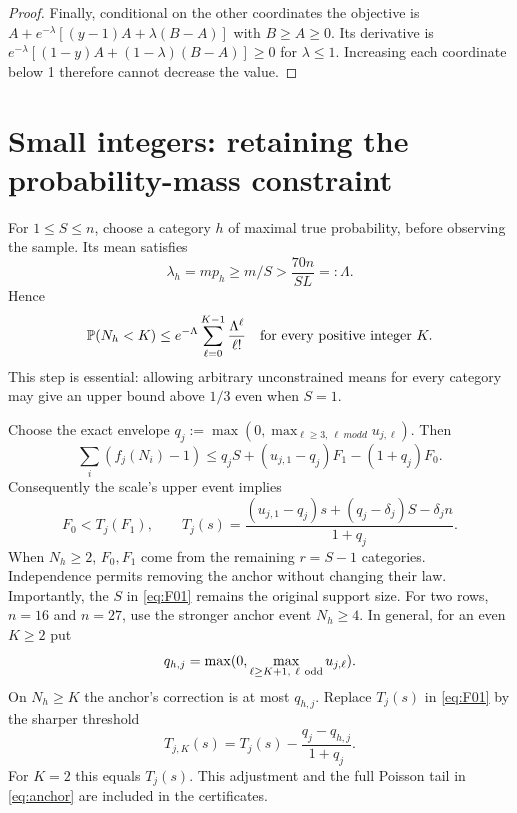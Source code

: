 \documentclass[11pt]{article}
\newcommand{\Prb}{\mathbb P}
\begin{document}
\begin{proof}
Finally, conditional on the other coordinates the objective is
$A+e^{-\lambda}[(y-1)A+\lambda(B-A)]$ with $B\ge A\ge0$.
Its derivative is
$e^{-\lambda}[(1-y)A+(1-\lambda)(B-A)]\ge0$ for $\lambda\le1$.
Increasing each coordinate below 1 therefore cannot decrease the value.
\end{proof}

\section{Small integers: retaining the probability-mass constraint}
For $1\le S\le n$, choose a category $h$ of maximal true probability,
before observing the sample. Its mean satisfies
\[
 \lambda_h=mp_h\ge m/S>\frac{70n}{SL}=:\Lambda.
\]
Hence
\begin{equation}\label{eq:anchor}
 \Prb(N_h<K)\le e^{-\Lambda}\sum_{\ell=0}^{K-1}\frac{\Lambda^\ell}{\ell!}
 \quad\hbox{for every positive integer }K.
\end{equation}
This step is essential: allowing arbitrary unconstrained means for every
category may give an upper bound above $1/3$ even when $S=1$.

Choose the exact envelope $q_j:=\max(0,\max_{\ell\ge3,\ \ell\ {
m odd}}u_{j,\ell})$.
Then
\[
 \sum_i(f_j(N_i)-1)
 \le q_j S+(u_{j,1}-q_j)F_1-(1+q_j)F_0.
\]
Consequently the scale's upper event implies
\begin{equation}\label{eq:F01}
 F_0<T_j(F_1),\qquad
 T_j(s)=\frac{(u_{j,1}-q_j)s+(q_j-\delta_j)S-\delta_jn}{1+q_j}.
\end{equation}
When $N_h\ge2$, $F_0,F_1$ come from the remaining $r=S-1$ categories.
Independence permits removing the anchor without changing their law.
Importantly, the $S$ in \eqref{eq:F01} remains the original support size.
For two rows, $n=16$ and $n=27$, use the stronger anchor event $N_h\ge4$.
In general, for an even $K\ge2$ put
\[
 q_{h,j}=\max(0,\max_{\ell\ge K+1,\ \ell\ {\rm odd}}u_{j,\ell}).
\]
On $N_h\ge K$ the anchor's correction is at most $q_{h,j}$. Replace
$T_j(s)$ in \eqref{eq:F01} by the sharper threshold
\[
 T_{j,K}(s)=T_j(s)-\frac{q_j-q_{h,j}}{1+q_j}.
\]
For $K=2$ this equals $T_j(s)$. This adjustment and the full Poisson
tail in \eqref{eq:anchor} are included in the certificates.
\end{document}
